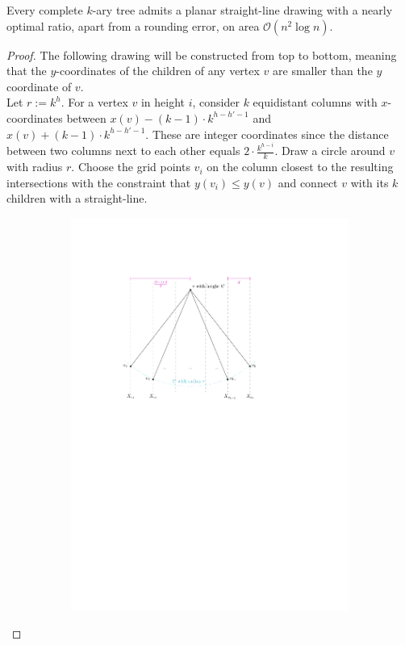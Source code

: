 \begin{theorem}
	Every complete $k$-ary tree admits a planar straight-line drawing with a nearly optimal ratio, apart from a rounding error, on area $\mathcal{O}(n^2\log n)$.
\end{theorem}
\begin{proof}
	The following drawing will be constructed from top to bottom, meaning that the $y$-coordinates of the children of any vertex $v$ are smaller than the $y$ coordinate of $v$.\\
	Let $r := k^h$. For a vertex $v$ in height $i$, consider $k$ equidistant columns with $x$-coordinates between $x(v) - (k-1)\cdot  k^{h-h'-1}$ and $x(v) + (k-1)\cdot  k^{h-h'-1}$. These are integer coordinates since the distance between two columns next to each other equals $2\cdot \frac{k^{h-i}}{k}$. Draw a circle around $v$ with radius $r$. Choose the grid points $v_i$ on the column closest to the resulting intersections with the constraint that $y(v_i) \leq y(v)$ and connect $v$ with its $k$ children with a straight-line.
\begin{figure}[H]
	\centering
		\begin{subfigure}{\textwidth}
			\centering
			\includegraphics[page=1,width=0.8\linewidth]{graphics/k-ary_tree_algorithm_construction.pdf}

\end{subfigure}
\end{figure}
\end{proof}
